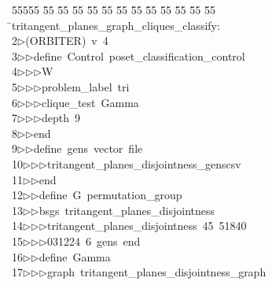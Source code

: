 %
%
\begin{tabbing}
55555 \= 55 \= 55 \= 55 \= 55 \= 55 \= 55 \= 55 \= 55 \= 55 \= 55 \= 55 \= 55 \= \>tritangent\_planes\_graph\_cliques\_classify:\\[0pt]
2\>$\triangleright$\>(ORBITER)\ v\ 4\ \\[0pt]
3\>$\triangleright$\>$\triangleright$\>define\ Control\ poset\_classification\_control\ \\[0pt]
4\>$\triangleright$\>$\triangleright$\>$\triangleright$\>W\ \\[0pt]
5\>$\triangleright$\>$\triangleright$\>$\triangleright$\>problem\_label\ tri\ \\[0pt]
6\>$\triangleright$\>$\triangleright$\>$\triangleright$\>clique\_test\ Gamma\ \\[0pt]
7\>$\triangleright$\>$\triangleright$\>$\triangleright$\>depth\ 9\ \\[0pt]
8\>$\triangleright$\>$\triangleright$\>end\ \\[0pt]
9\>$\triangleright$\>$\triangleright$\>define\ gens\ vector\ file\ \\[0pt]
10\>$\triangleright$\>$\triangleright$\>$\triangleright$\>tritangent\_planes\_disjointness\_genscsv\ \\[0pt]
11\>$\triangleright$\>$\triangleright$\>end\ \\[0pt]
12\>$\triangleright$\>$\triangleright$\>define\ G\ permutation\_group\ \\[0pt]
13\>$\triangleright$\>$\triangleright$\>bsgs\ tritangent\_planes\_disjointness\ \\[0pt]
14\>$\triangleright$\>$\triangleright$\>$\triangleright$\>tritangent\_planes\_disjointness\ 45\ 51840\ \\[0pt]
15\>$\triangleright$\>$\triangleright$\>$\triangleright$\>031224\ 6\ gens\ end\ \\[0pt]
16\>$\triangleright$\>$\triangleright$\>define\ Gamma\ \\[0pt]
17\>$\triangleright$\>$\triangleright$\>$\triangleright$\>graph\ tritangent\_planes\_disjointness\_graph\ \\[0pt]

\end{tabbing}
